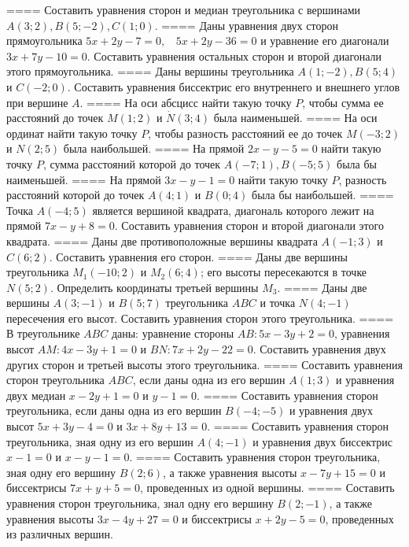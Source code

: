 ====
Составить уравнения сторон и медиан треугольника с вершинами \(A(3;2),B(5; - 2),C(1;0)\).
====
Даны уравнения двух сторон прямоугольника \(5x + 2y - 7 = 0,\ \ \ \ 5x + 2y - 36 = 0\) и уравнение его диагонали \(3x + 7y - 10 = 0\). Составить уравнения остальных сторон и второй диагонали этого прямоугольника.
====
Даны вершины треугольника \(A(1; - 2),B(5;4)\) и \(C( - 2;0)\). Составить уравнения биссектрис его внутреннего и внешнего углов при вершине \(A\).
====
На оси абсцисс найти такую точку \(P\), чтобы сумма ее расстояний до точек \(M(1;2)\) и \(\dot{N}(3;4)\) была наименьшей.
====
На оси ординат найти такую точку \(P\), чтобы разность расстояний ее до точек \(M( - 3;2)\) и \(N(2;5)\) была наибольшей.
====
На прямой \(2x - y - 5 = 0\) найти такую точку \(P\), сумма расстояний которой до точек \(A( - 7;1),B( - 5;5)\) была бы наименьшей.
====
На прямой \(3x - y - 1 = 0\) найти такую точку \(P\), разность расстояний которой до точек \(A(4;1)\) и \(B(0;4)\) была бы наибольшей.
====
Точка \(A( - 4;5)\) является вершиной квадрата, диагональ которого лежит на прямой \(7x - y + 8 = 0\). Составить уравнения сторон и второй диагонали этого квадрата.
====
Даны две противоположные вершины квадрата \(A( - 1;3)\) и \(C(6;2)\). Составить уравнения его сторон.
====
Даны две вершины треугольника \(M_{1}( - 10;2)\) и \(M_{2}(6;4)\); его высоты пересекаются в точке \(N(5;2)\). Определить координаты третьей вершины \(M_{3}\).
====
Даны две вершины \(A(3; - 1)\) и \(B(5;7)\) треугольника \(ABC\) и точка \(N(4; - 1)\) пересечения его высот. Составить уравнения сторон этого треугольника.
====
В треугольнике \(ABC\) даны: уравнение стороны \(AB:5x - 3y + 2 = 0\), уравнения высот \(AM:4x - 3y + 1 = 0\) и \(BN:7x + 2y - 22 = 0\). Составить уравнения двух других сторон и третьей высоты этого треугольника.
====
Составить уравнения сторон треугольника \(ABC\), если даны одна из его вершин \(A(1;3)\) и уравнения двух медиан \(x - 2y + 1 = 0\) и \(y - 1 = 0\).
====
Составить уравнения сторон треугольника, если даны одна из его вершин \(B( - 4; - 5)\) и уравнения двух высот \(5x + 3y - 4 = 0\) и \(3x + 8y + 13 = 0\).
====
Составить уравнения сторон треугольника, зная одну из его вершин \(A(4; - 1)\) и уравнения двух биссектрис \(x - 1 = 0\) и \(x - y - 1 = 0\).
====
Составить уравнения сторон треугольника, зная одну его вершину \(B(2;6)\), а также уравнения высоты \(x - 7y + 15 = 0\) и биссектрисы \(7x + y + 5 = 0\), проведенных из одной вершины.
====
Составить уравнения сторон треугольника, знал одну его вершину \(B(2; - 1)\), а также уравнения высоты \(3x - 4y + 27 = 0\) и биссектрисы \(x + 2y - 5 = 0\), проведенных из различных вершин.
